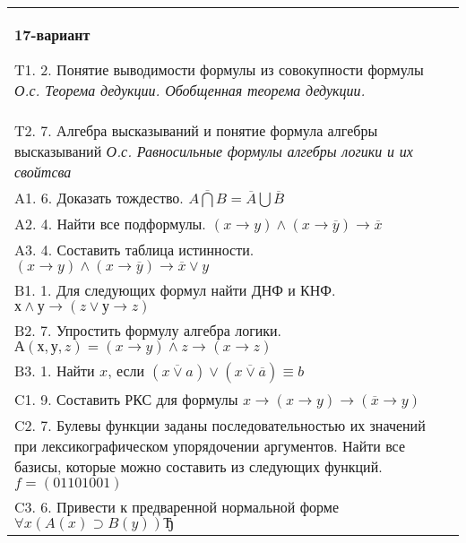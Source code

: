 \documentclass{article}
\begin{document}
\begin{tabular}{m{17cm}}
\textbf{17-вариант}
\newline

T1. 2. Понятие выводимости формулы из совокупности формулы \emph{О.с. Теорема дедукции. Обобщенная теорема дедукции.} \\
T2. 7. Алгебра высказываний и понятие формула алгебры высказываний \emph{О.с. Равносильные формулы алгебры логики и их свойтсва} \\
A1. 6. Доказать тождество. \(\overline{A\bigcap B} = \overline{A}\bigcup\overline{B}\) \\
A2. 4. Найти все подформулы. \((x \rightarrow y) \land (x \rightarrow \overline{y}) \rightarrow \overline{x}\) \\
A3. 4. Составить таблица истинности. \((x \rightarrow y) \land (x \rightarrow \overline{y}) \rightarrow \overline{x} \vee y\) \\
B1. 1. Для следующих формул найти ДНФ и КНФ. \(х \land у \rightarrow (z \vee у \rightarrow z)\) \\
B2. 7. Упростить формулу алгебра логики. \(А(х,у,z) = (x \rightarrow y) \land z \rightarrow (x \rightarrow z)\) \\
B3. 1. Найти \(x\), если \(\left( \overline{x \vee a} \right) \vee \left( \overline{x \vee \overline{a}} \right) \equiv b\) \\
C1. 9. Составить РКС для формулы \(x \rightarrow (x \rightarrow y) \rightarrow (\overline{x} \rightarrow y)\ \) \\
C2. 7. Булевы функции заданы последовательностью их значений при лексикографическом упорядочении аргументов. Найти все базисы, которые можно составить из следующих функций. \(f = (01101001)\) \\
C3. 6. Привести к предваренной нормальной форме \(\forall x(A(x) \supset B(y))Ђ\) \\

\end{tabular}
\vspace{1cm}
\end{document}
